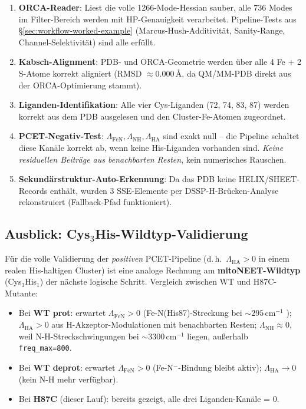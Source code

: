 \documentclass[11pt,a4paper,twoside]{article}
\providecommand{\angstrom}{\text{\AA}}    %
\theoremstyle{remark}
\begin{document}
\begin{enumerate}
  \item \textbf{ORCA-Reader}: Liest die volle 1266-Mode-Hessian
        sauber, alle 736 Modes im Filter-Bereich werden mit
        HP-Genauigkeit verarbeitet. Pipeline-Tests aus
        \S\ref{sec:workflow-worked-example} (Marcus-Hush-Additivit\"at,
        Sanity-Range, Channel-Selektivit\"at) sind alle erf\"ullt.
  \item \textbf{Kabsch-Alignment}: PDB- und ORCA-Geometrie werden
        \"uber alle 4 Fe + 2 S-Atome korrekt aligniert (RMSD
        $\approx 0.000$\,$\angstrom$, da QM/MM-PDB direkt aus der
        ORCA-Optimierung stammt).
  \item \textbf{Liganden-Identifikation}: Alle vier Cys-Liganden
        (72, 74, 83, 87) werden korrekt aus dem PDB ausgelesen
        und den Cluster-Fe-Atomen zugeordnet.
  \item \textbf{PCET-Negativ-Test}: $\Lambda_\text{FeN}, \Lambda_\text{NH},
        \Lambda_\text{HA}$ sind exakt null -- die Pipeline schaltet
        diese Kan\"ale korrekt ab, wenn keine His-Liganden vorhanden
        sind. \emph{Keine residuellen Beitr\"age aus benachbarten
        Resten}, kein numerisches Rauschen.
  \item \textbf{Sekund\"arstruktur-Auto-Erkennung}: Da das PDB keine
        HELIX/SHEET-Records enth\"alt, wurden 3 SSE-Elemente per
        DSSP-H-Br\"ucken-Analyse rekonstruiert (Fallback-Pfad
        funktioniert).
\end{enumerate}

\subsection{Ausblick: Cys$_3$His-Wildtyp-Validierung}
\label{sec:val-cys3his-wt}

F\"ur die volle Validierung der \emph{positiven} PCET-Pipeline
(d.\,h.\ $\Lambda_\text{HA} > 0$ in einem realen His-haltigen Cluster)
ist eine analoge Rechnung am \textbf{mitoNEET-Wildtyp}
(Cys$_3$His$_1$) der n\"achste logische Schritt. Vergleich
zwischen WT und H87C-Mutante:

\begin{itemize}\setlength{\itemsep}{0pt}
  \item Bei \textbf{WT prot}: erwartet $\Lambda_\text{FeN} > 0$
        (Fe-N(His87)-Streckung bei $\sim 295$\,cm$^{-1}$
        \cite{Gee2021}); $\Lambda_\text{HA} > 0$ aus
        H-Akzeptor-Modulationen mit benachbarten Resten;
        $\Lambda_\text{NH} \approx 0$, weil N-H-Streckschwingungen
        bei $\sim 3300$\,cm$^{-1}$ liegen, au{\ss}erhalb
        \texttt{freq\_max=800}.
  \item Bei \textbf{WT deprot}: erwartet $\Lambda_\text{FeN} > 0$
        (Fe-N$^-$-Bindung bleibt aktiv); $\Lambda_\text{HA} \to 0$
        (kein N-H mehr verf\"ugbar).
  \item Bei \textbf{H87C} (dieser Lauf): bereits gezeigt, alle drei
        Liganden-Kan\"ale = 0.
\end{itemize}
\end{document}
